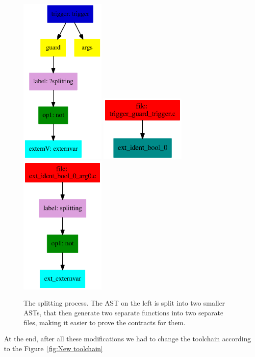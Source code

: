 \documentclass[a4paper,11pt,final]{article}
\begin{document}
	\begin{figure}[!htb]
		\includegraphics[width=42mm]{images/label/main.ps}
		\centering
		\includegraphics[width=42mm]{images/label/splitted.ps}
		\includegraphics[width=42mm]{images/label/splitted2.ps}
		\caption{The splitting process. The AST on the left is split into two smaller ASTs, that then generate two separate functions into two separate files, making it easier to prove the contracts for them.}
		\label{fig:splitting label}
	\end{figure}
	
	At the end, after all these modifications we had to change the toolchain according to the Figure~\ref{fig:New toolchain}
	
\end{document}
